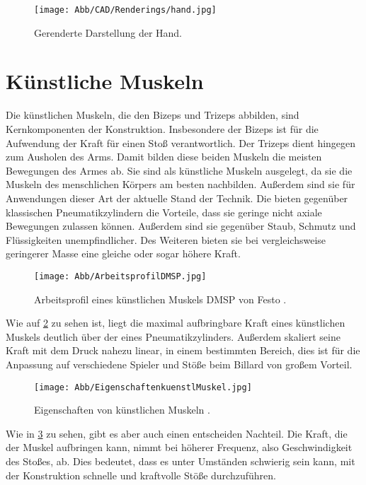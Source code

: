 		\begin{figure}[h]
			\centering
			\texttt{[image: Abb/CAD/Renderings/hand.jpg]}
			\caption[Gerenderte Darstellung der Hand]{Gerenderte Darstellung der Hand.}%
			\label{fig:rendering hand}
		\end{figure}
	
	\section{Künstliche Muskeln}
		Die künstlichen Muskeln, die den Bizeps und Trizeps abbilden, sind Kernkomponenten der Konstruktion.
		Insbesondere der Bizeps ist für die Aufwendung der Kraft für einen Stoß verantwortlich.
		Der Trizeps dient hingegen zum Ausholen des Arms.
		Damit bilden diese beiden Muskeln die meisten Bewegungen des Armes ab.
		Sie sind als künstliche Muskeln ausgelegt, da sie die Muskeln des menschlichen Körpers am besten nachbilden.
		Außerdem sind sie für Anwendungen dieser Art der aktuelle Stand der Technik.
		Die bieten gegenüber klassischen Pneumatikzylindern die Vorteile, dass sie geringe nicht axiale Bewegungen zulassen können.
		Außerdem sind sie gegenüber Staub, Schmutz und Flüssigkeiten unempfindlicher.
		Des Weiteren bieten sie bei vergleichsweise geringerer Masse eine gleiche oder sogar höhere Kraft.

		\begin{figure}[h]
			\centering
			\texttt{[image: Abb/ArbeitsprofilDMSP.jpg]}
			\caption{Arbeitsprofil eines künstlichen Muskels DMSP von Festo \cite{DMSP.specs}.}
			\label{fig:ArbeitsprofilDMSP}
		\end{figure}

		Wie auf \cref{fig:ArbeitsprofilDMSP} zu sehen ist, liegt die maximal aufbringbare Kraft eines künstlichen Muskels deutlich über der eines Pneumatikzylinders.
		Außerdem skaliert seine Kraft mit dem Druck nahezu linear, in einem bestimmten Bereich, dies ist für die Anpassung auf verschiedene Spieler und Stöße beim Billard von großem Vorteil.

		\begin{figure}[h]
			\centering
			\texttt{[image: Abb/EigenschaftenkuenstlMuskel.jpg]}
			\caption{Eigenschaften von künstlichen Muskeln \cite{DMSP.specs}.}
			\label{fig:EigenschaftenkuenstlMuskel}
		\end{figure}

		Wie in \cref{fig:EigenschaftenkuenstlMuskel} zu sehen, gibt es aber auch einen entscheiden Nachteil. Die Kraft, die der Muskel aufbringen kann, nimmt bei höherer Frequenz, also Geschwindigkeit des Stoßes, ab.
		Dies bedeutet, dass es unter Umständen schwierig sein kann, mit der Konstruktion schnelle und kraftvolle Stöße durchzuführen.

